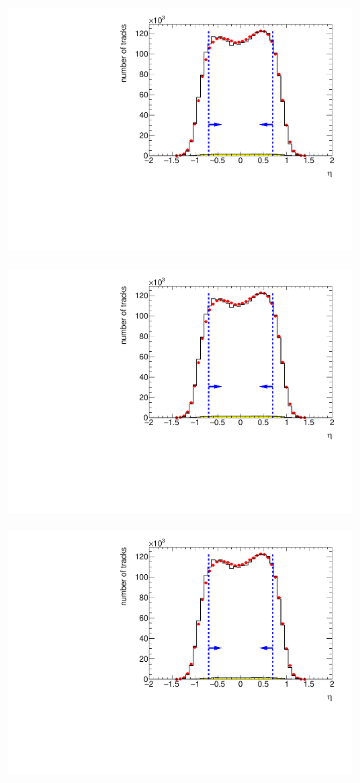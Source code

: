 \begin{figure}[b!]
	\centering
	\begin{subfigure}{.45\textwidth}
		\includegraphics[width=\textwidth, page=10]{chapters/chrgSTAR/img/selection/SDT.pdf}
		\caption{}
	\end{subfigure}
	\begin{subfigure}{.45\textwidth}
		\includegraphics[width=\textwidth, page=9]{chapters/chrgSTAR/img/selection/SDT.pdf}
		\caption{}
	\end{subfigure}
	\begin{subfigure}{.45\textwidth}
		\includegraphics[width=\textwidth, page=5]{chapters/chrgSTAR/img/selection/SDT.pdf}

\end{subfigure}
\end{figure}
